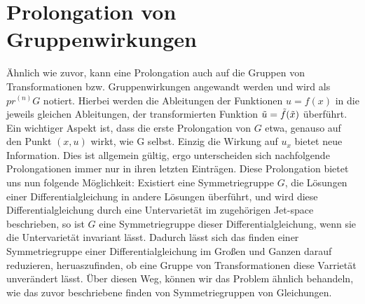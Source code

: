 \documentclass[a4paper]{article}
\begin{document}
\section{Prolongation von Gruppenwirkungen}
Ähnlich wie zuvor, kann eine Prolongation auch auf die Gruppen von Transformationen bzw. Gruppenwirkungen angewandt werden und wird als $pr^{(n)} G$ notiert. Hierbei werden die Ableitungen der Funktionen $u=f(x)$ in die jeweils gleichen Ableitungen, der transformierten Funktion $\Tilde{u}=\Tilde{f}(\Tilde{x})$ überführt. Ein wichtiger Aspekt ist, dass die erste Prolongation von $G$ etwa, genauso auf den Punkt $(x,u)$ wirkt, wie G selbst. Einzig die Wirkung auf $u_x$ bietet neue Information. Dies ist allgemein gültig, ergo unterscheiden sich nachfolgende Prolongationen immer nur in ihren letzten Einträgen.
\newline
Diese Prolongation bietet uns nun folgende Möglichkeit: Existiert eine Symmetriegruppe $G$, die Lösungen einer Differentialgleichung in andere Lösungen überführt, und wird diese Differentialgleichung durch eine Untervarietät im zugehörigen Jet-space beschrieben, so ist $G$ eine Symmetriegruppe dieser Differentialgleichung, wenn sie die Untervarietät invariant lässt. Dadurch lässt sich das finden einer Symmetriegruppe einer Differentialgleichung im Großen und Ganzen darauf reduzieren, heruaszufinden, ob eine Gruppe von Transformationen diese Varrietät unverändert lässt. Über diesen Weg, können wir das Problem ähnlich behandeln, wie das zuvor beschriebene finden von Symmetriegruppen von Gleichungen.
\end{document}
